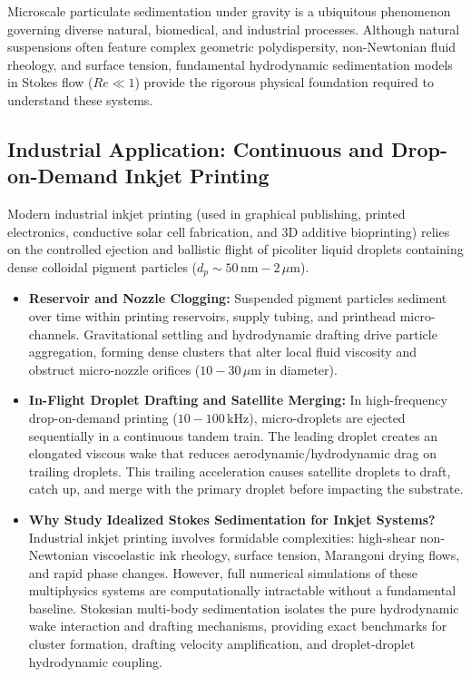 \documentclass[11pt,a4paper]{article}
\begin{document}
Microscale particulate sedimentation under gravity is a ubiquitous phenomenon governing diverse natural, biomedical, and industrial processes. Although natural suspensions often feature complex geometric polydispersity, non-Newtonian fluid rheology, and surface tension, fundamental hydrodynamic sedimentation models in Stokes flow ($Re \ll 1$) provide the rigorous physical foundation required to understand these systems.

\subsection{Industrial Application: Continuous and Drop-on-Demand Inkjet Printing}
Modern industrial inkjet printing (used in graphical publishing, printed electronics, conductive solar cell fabrication, and 3D additive bioprinting) relies on the controlled ejection and ballistic flight of picoliter liquid droplets containing dense colloidal pigment particles ($d_p \sim 50\,\text{nm} - 2\,\mu\text{m}$).
\begin{itemize}
    \item \textbf{Reservoir and Nozzle Clogging:} Suspended pigment particles sediment over time within printing reservoirs, supply tubing, and printhead micro-channels. Gravitational settling and hydrodynamic drafting drive particle aggregation, forming dense clusters that alter local fluid viscosity and obstruct micro-nozzle orifices ($10 - 30\,\mu\text{m}$ in diameter).
    \item \textbf{In-Flight Droplet Drafting and Satellite Merging:} In high-frequency drop-on-demand printing ($10 - 100\,\text{kHz}$), micro-droplets are ejected sequentially in a continuous tandem train. The leading droplet creates an elongated viscous wake that reduces aerodynamic/hydrodynamic drag on trailing droplets. This trailing acceleration causes satellite droplets to draft, catch up, and merge with the primary droplet before impacting the substrate.
    \item \textbf{Why Study Idealized Stokes Sedimentation for Inkjet Systems?} 
    Industrial inkjet printing involves formidable complexities: high-shear non-Newtonian viscoelastic ink rheology, surface tension, Marangoni drying flows, and rapid phase changes. However, full numerical simulations of these multiphysics systems are computationally intractable without a fundamental baseline. Stokesian multi-body sedimentation isolates the pure hydrodynamic wake interaction and drafting mechanisms, providing exact benchmarks for cluster formation, drafting velocity amplification, and droplet-droplet hydrodynamic coupling.
\end{itemize}
\end{document}
